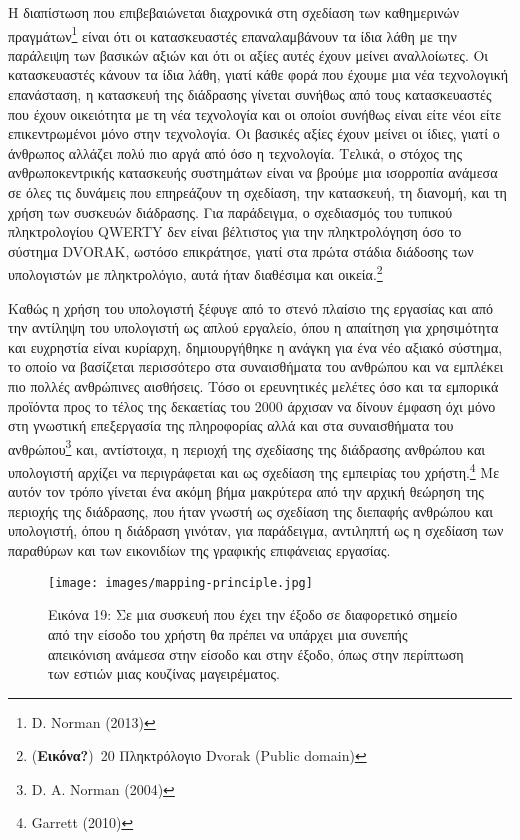 \documentclass[
]{article}
\begin{document}
Η διαπίστωση που επιβεβαιώνεται διαχρονικά στη σχεδίαση των καθημερινών
πραγμάτων\footnote{D. Norman (2013)} είναι ότι οι κατασκευαστές
επαναλαμβάνουν τα ίδια λάθη με την παράλειψη των βασικών αξιών και ότι
οι αξίες αυτές έχουν μείνει αναλλοίωτες. Οι κατασκευαστές κάνουν τα ίδια
λάθη, γιατί κάθε φορά που έχουμε μια νέα τεχνολογική επανάσταση, η
κατασκευή της διάδρασης γίνεται συνήθως από τους κατασκευαστές που έχουν
οικειότητα με τη νέα τεχνολογία και οι οποίοι συνήθως είναι είτε νέοι
είτε επικεντρωμένοι μόνο στην τεχνολογία. Οι βασικές αξίες έχουν μείνει
οι ίδιες, γιατί ο άνθρωπος αλλάζει πολύ πιο αργά από όσο η τεχνολογία.
Τελικά, ο στόχος της ανθρωποκεντρικής κατασκευής συστημάτων είναι να
βρούμε μια ισορροπία ανάμεσα σε όλες τις δυνάμεις που επηρεάζουν τη
σχεδίαση, την κατασκευή, τη διανομή, και τη χρήση των συσκευών
διάδρασης. Για παράδειγμα, ο σχεδιασμός του τυπικού πληκτρολογίου QWERTY
δεν είναι βέλτιστος για την πληκτρολόγηση όσο το σύστημα DVORAK, ωστόσο
επικράτησε, γιατί στα πρώτα στάδια διάδοσης των υπολογιστών με
πληκτρολόγιο, αυτά ήταν διαθέσιμα και οικεία.\footnote{(\textbf{Εικόνα?})~20
  Πληκτρόλογιο Dvorak (Public domain)}

Καθώς η χρήση του υπολογιστή ξέφυγε από το στενό πλαίσιο της εργασίας
και από την αντίληψη του υπολογιστή ως απλού εργαλείο, όπου η απαίτηση
για χρησιμότητα και ευχρηστία είναι κυρίαρχη, δημιουργήθηκε η ανάγκη για
ένα νέο αξιακό σύστημα, το οποίο να βασίζεται περισσότερο στα
συναισθήματα του ανθρώπου και να εμπλέκει πιο πολλές ανθρώπινες
αισθήσεις. Τόσο οι ερευνητικές μελέτες όσο και τα εμπορικά προϊόντα προς
το τέλος της δεκαετίας του 2000 άρχισαν να δίνουν έμφαση όχι μόνο στη
γνωστική επεξεργασία της πληροφορίας αλλά και στα συναισθήματα του
ανθρώπου\footnote{D. A. Norman (2004)} και, αντίστοιχα, η περιοχή της
σχεδίασης της διάδρασης ανθρώπου και υπολογιστή αρχίζει να περιγράφεται
και ως σχεδίαση της εμπειρίας του χρήστη.\footnote{Garrett (2010)} Με
αυτόν τον τρόπο γίνεται ένα ακόμη βήμα μακρύτερα από την αρχική θεώρηση
της περιοχής της διάδρασης, που ήταν γνωστή ως σχεδίαση της διεπαφής
ανθρώπου και υπολογιστή, όπου η διάδραση γινόταν, για παράδειγμα,
αντιληπτή ως η σχεδίαση των παραθύρων και των εικονιδίων της γραφικής
επιφάνειας εργασίας.

\leavevmode{}%
\begin{figure}
\hypertarget{fig:mapping-principle}{%
\centering
\texttt{[image: images/mapping-principle.jpg]}
\caption{Εικόνα 19: Σε μια συσκευή που έχει την έξοδο σε διαφορετικό
σημείο από την είσοδο του χρήστη θα πρέπει να υπάρχει μια συνεπής
απεικόνιση ανάμεσα στην είσοδο και στην έξοδο, όπως στην περίπτωση των
εστιών μιας κουζίνας μαγειρέματος.}\label{fig:mapping-principle}
}
\end{figure}
\end{document}
